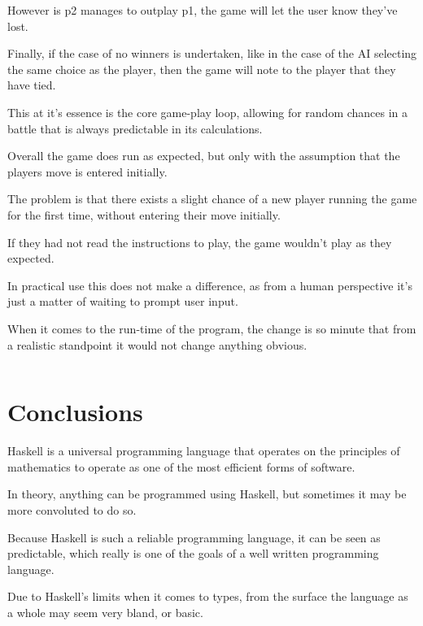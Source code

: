 \documentclass{article}
\begin{document}
\medskip\noindent
However is p2 manages to outplay p1, the game will let the user know they've lost.

\medskip\noindent
Finally, if the case of no winners is undertaken, like in the case of the AI selecting the same choice as the player, then the game will note to the player that they have tied.

\medskip\noindent
This at it's essence is the core game-play loop, allowing for random chances in a battle that is always predictable in its calculations.

\medskip\noindent
Overall the game does run as expected, but only with the assumption that the players move is entered initially.

\medskip\noindent
The problem is that there exists a slight chance of a new player running the game for the first time, without entering their move initially.

\medskip\noindent
If they had not read the instructions to play, the game wouldn't play as they expected.

\medskip\noindent
In practical use this does not make a difference, as from a human perspective it's just a matter of waiting to prompt user input. 

\medskip\noindent
When it comes to the run-time of the program, the change is so minute that from a realistic standpoint it would not change anything obvious.

\medskip\medskip
\begin{lstlisting}
\end{lstlisting}
\section{Conclusions}\label{conclusions}
\medskip\medskip
\hspace{\parindent} 

Haskell is a universal programming language that operates on the principles of mathematics to operate as one of the most efficient forms of software. 

\medskip\noindent
In theory, anything can be programmed using Haskell, but sometimes it may be more convoluted to do so. 

\medskip\noindent
Because Haskell is such a reliable programming language, it can be seen as predictable, which really is one of the goals of a well written programming language.

\medskip\noindent
Due to Haskell's limits when it comes to types, from the surface the language as a whole may seem very bland, or basic.
\end{document}
